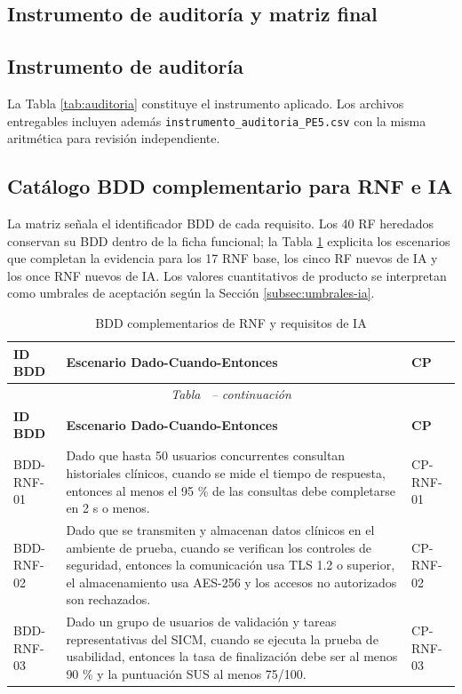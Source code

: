\documentclass[11pt,a4paper]{article}
\begin{document}
	\clearpage
	\begin{appendices}
		\section{Instrumento de auditoría y matriz final}
		\subsection{Instrumento de auditoría}
		La Tabla \ref{tab:auditoria} constituye el instrumento aplicado. Los archivos entregables incluyen además \texttt{instrumento\_auditoria\_PE5.csv} con la misma aritmética para revisión independiente.


				\subsection{Catálogo BDD complementario para RNF e IA}
		La matriz señala el identificador BDD de cada requisito. Los 40 RF heredados conservan su BDD dentro de la ficha funcional; la Tabla \ref{tab:bddcomplementario} explicita los escenarios que completan la evidencia para los 17 RNF base, los cinco RF nuevos de IA y los once RNF nuevos de IA. Los valores cuantitativos de producto se interpretan como umbrales de aceptación según la Sección \ref{subsec:umbrales-ia}.
		\scriptsize
		\begin{longtable}{p{2.8cm}p{10.6cm}p{2cm}}
			\caption{BDD complementarios de RNF y requisitos de IA}\label{tab:bddcomplementario}\\
			\toprule\textbf{ID BDD}&\textbf{Escenario Dado-Cuando-Entonces}&\textbf{CP}\\\midrule
			\endfirsthead
			\multicolumn{3}{c}{\small\textit{Tabla \thetable\ -- continuación}}\\
			\toprule\textbf{ID BDD}&\textbf{Escenario Dado-Cuando-Entonces}&\textbf{CP}\\\midrule
			\endhead
			BDD-RNF-01 & Dado que hasta 50 usuarios concurrentes consultan historiales clínicos, cuando se mide el tiempo de respuesta, entonces al menos el 95 \% de las consultas debe completarse en 2 s o menos. & CP-RNF-01\\
			BDD-RNF-02 & Dado que se transmiten y almacenan datos clínicos en el ambiente de prueba, cuando se verifican los controles de seguridad, entonces la comunicación usa TLS 1.2 o superior, el almacenamiento usa AES-256 y los accesos no autorizados son rechazados. & CP-RNF-02\\
			BDD-RNF-03 & Dado un grupo de usuarios de validación y tareas representativas del SICM, cuando se ejecuta la prueba de usabilidad, entonces la tasa de finalización debe ser al menos 90 \% y la puntuación SUS al menos 75/100. & CP-RNF-03\\

\end{longtable}
\end{appendices}
\end{document}
